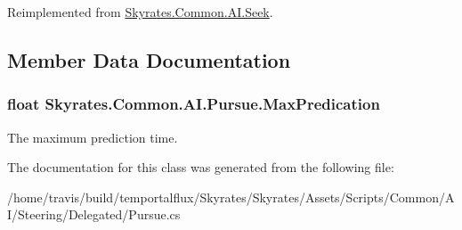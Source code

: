 Reimplemented from \hyperlink{class_skyrates_1_1_common_1_1_a_i_1_1_seek_aed4d8c27e1d2fbd18a7616291be6c8b5}{Skyrates.\-Common.\-A\-I.\-Seek}.



\subsection{Member Data Documentation}
\hypertarget{class_skyrates_1_1_common_1_1_a_i_1_1_pursue_aaceb63cfe207670141eeda4fe06ca724}{
\subsubsection[{Max\-Predication}]{\setlength{\rightskip}{0pt plus 5cm}float Skyrates.\-Common.\-A\-I.\-Pursue.\-Max\-Predication}}\label{class_skyrates_1_1_common_1_1_a_i_1_1_pursue_aaceb63cfe207670141eeda4fe06ca724}


The maximum prediction time. 



The documentation for this class was generated from the following file\-:\begin{DoxyCompactItemize}
\item 
/home/travis/build/temportalflux/\-Skyrates/\-Skyrates/\-Assets/\-Scripts/\-Common/\-A\-I/\-Steering/\-Delegated/Pursue.\-cs\end{DoxyCompactItemize}
